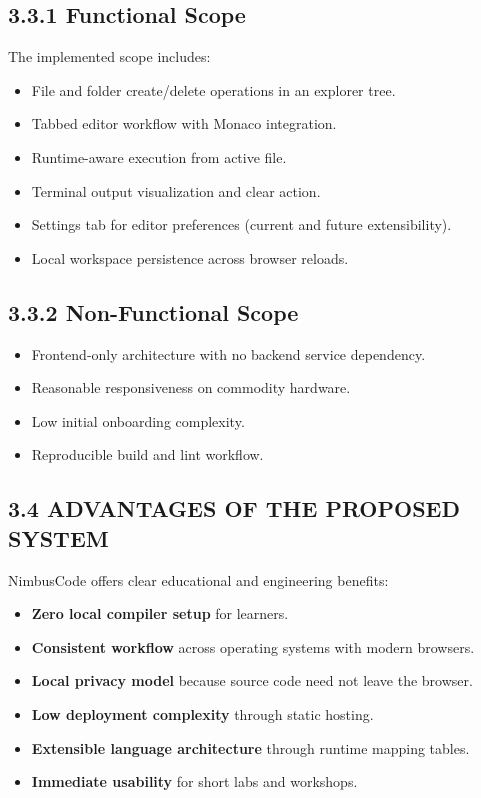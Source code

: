 \subsection*{3.3.1 Functional Scope}
The implemented scope includes:
\begin{itemize}[leftmargin=8mm]
\item File and folder create/delete operations in an explorer tree.
\item Tabbed editor workflow with Monaco integration.
\item Runtime-aware execution from active file.
\item Terminal output visualization and clear action.
\item Settings tab for editor preferences (current and future extensibility).
\item Local workspace persistence across browser reloads.
\end{itemize}

\subsection*{3.3.2 Non-Functional Scope}
\begin{itemize}[leftmargin=8mm]
\item Frontend-only architecture with no backend service dependency.
\item Reasonable responsiveness on commodity hardware.
\item Low initial onboarding complexity.
\item Reproducible build and lint workflow.
\end{itemize}

\subsection{3.4 ADVANTAGES OF THE PROPOSED SYSTEM}
NimbusCode offers clear educational and engineering benefits:
\begin{itemize}[leftmargin=8mm]
\item \textbf{Zero local compiler setup} for learners.
\item \textbf{Consistent workflow} across operating systems with modern browsers.
\item \textbf{Local privacy model} because source code need not leave the browser.
\item \textbf{Low deployment complexity} through static hosting.
\item \textbf{Extensible language architecture} through runtime mapping tables.
\item \textbf{Immediate usability} for short labs and workshops.
\end{itemize}

